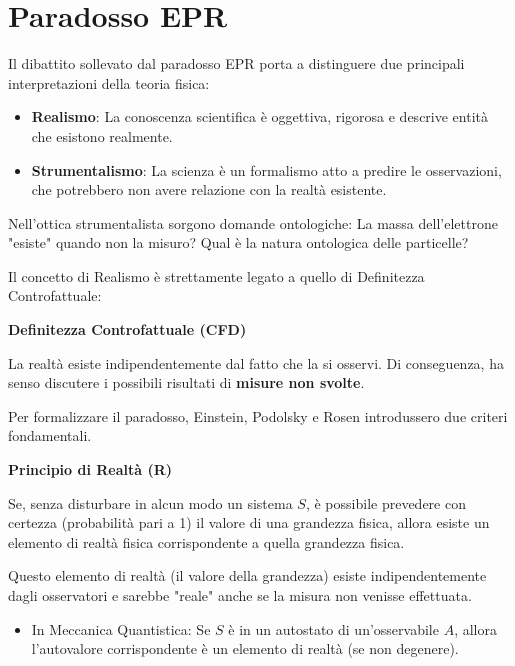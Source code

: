 \section{Paradosso EPR}

Il dibattito sollevato dal paradosso EPR porta a distinguere due principali interpretazioni della teoria fisica:

\begin{itemize}
    \item \textbf{Realismo}: La conoscenza scientifica è oggettiva, rigorosa e descrive entità che esistono realmente.
    \item \textbf{Strumentalismo}: La scienza è un formalismo atto a predire le osservazioni, che potrebbero non avere relazione con la realtà esistente.
\end{itemize}

\begin{remark}
    Nell'ottica strumentalista sorgono domande ontologiche: La massa dell'elettrone "esiste" quando non la misuro? Qual è la natura ontologica delle particelle?
\end{remark}

Il concetto di Realismo è strettamente legato a quello di Definitezza Controfattuale:

\begin{definition}
    \textbf{Definitezza Controfattuale (CFD)}
    
    La realtà esiste indipendentemente dal fatto che la si osservi. Di conseguenza, ha senso discutere i possibili risultati di \textbf{misure non svolte}.

\end{definition}

Per formalizzare il paradosso, Einstein, Podolsky e Rosen introdussero due criteri fondamentali.

\begin{definition}
    \textbf{Principio di Realtà (R)}
    
    Se, senza disturbare in alcun modo un sistema \( S \), è possibile prevedere con certezza (probabilità pari a 1) il valore di una grandezza fisica, allora esiste un elemento di realtà fisica corrispondente a quella grandezza fisica.
    
    Questo elemento di realtà (il valore della grandezza) esiste indipendentemente dagli osservatori e sarebbe "reale" anche se la misura non venisse effettuata.
    \begin{itemize}
        \item In Meccanica Quantistica: Se \( S \) è in un autostato di un'osservabile \( A \), allora l'autovalore corrispondente è un elemento di realtà (se non degenere).
    \end{itemize}
\end{definition}


